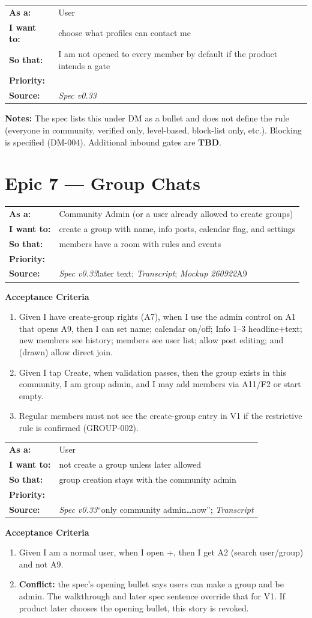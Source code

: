 \documentclass[11pt,a4paper]{article}
\makeatletter
\newcommand{\priPzero}{\colorbox{p0}{\makebox[4.6em]{\textcolor{white}{\scriptsize\bfseries P0 V1}}}}
\newcommand{\priTBD}{\colorbox{tbd}{\makebox[4.6em]{\textcolor{white}{\scriptsize\bfseries TBD}}}}
\newcommand{\srcSpec}{\textit{Spec v0.33}}
\newcommand{\srcTx}{\textit{Transcript}}
\newcommand{\srcMock}{\textit{Mockup 260922}}
\newenvironment{story}[1]{%
  \Needspace{10\baselineskip}%
  \vspace{0.7em}%
  \noindent
  \colorbox{navy}{\makebox[\dimexpr\textwidth-2\fboxsep\relax][l]{\textcolor{white}{\bfseries\ #1}}}%
  \par\vspace{0.35em}%
}{\par\vspace{0.55em}}
\newcommand{\storymeta}[5]{%
  \noindent
  \begin{tabularx}{\textwidth}{@{}>{\bfseries}l X@{}}
    As a: & #1 \\
    I want to: & #2 \\
    So that: & #3 \\
    Priority: & #4 \\
    Source: & #5 \\
  \end{tabularx}
  \par\vspace{0.3em}
}
\newcommand{\achead}{\noindent\textbf{Acceptance Criteria}\par}
\newcommand{\notes}[1]{\noindent\textbf{Notes:} #1\par}
\makeatother
\begin{document}
\begin{story}{DM-006 --- Who may start a DM (``profiles that can contact me'')}
\storymeta{User}{choose what profiles can contact me}{I am not opened to every member by default if the product intends a gate}{\priTBD}{\srcSpec}
\notes{The spec lists this under DM as a bullet and does not define the rule (everyone in community, verified only, level-based, block-list only, etc.). Blocking is specified (DM-004). Additional inbound gates are \textbf{TBD}.}
\end{story}

\newpage
\section{Epic 7 --- Group Chats}

\begin{story}{GROUP-001 --- Community admin creates a group (V1)}
\storymeta{Community Admin (or a user already allowed to create groups)}{create a group with name, info posts, calendar flag, and settings}{members have a room with rules and events}{\priPzero}{\srcSpec later text; \srcTx; \srcMock A9}
\achead
\begin{enumerate}
  \item Given I have create-group rights (A7), when I use the admin control on A1 that opens A9, then I can set name; calendar on/off; Info 1--3 headline+text; new members see history; members see user list; allow post editing; and (drawn) allow direct join.
  \item Given I tap Create, when validation passes, then the group exists in this community, I am group admin, and I may add members via A11/F2 or start empty.
  \item Regular members must not see the create-group entry in V1 if the restrictive rule is confirmed (GROUP-002).
\end{enumerate}
\end{story}

\begin{story}{GROUP-002 --- Regular users cannot create groups in V1}
\storymeta{User}{not create a group unless later allowed}{group creation stays with the community admin}{\priPzero}{\srcSpec ``only community admin\ldots now''; \srcTx}
\achead
\begin{enumerate}
  \item Given I am a normal user, when I open +, then I get A2 (search user/group) and not A9.
  \item \textbf{Conflict:} the spec's opening bullet says users can make a group and be admin. The walkthrough and later spec sentence override that for V1. If product later chooses the opening bullet, this story is revoked.
\end{enumerate}
\end{story}
\end{document}
